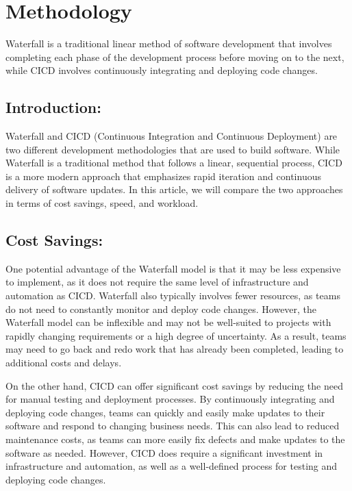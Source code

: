 \documentclass[
  10pt,
  paper=a4,
  ,captions=tableheading
]{scrartcl}
\begin{document}
\hypertarget{methodology}{%
\section{Methodology}\label{methodology}}

Waterfall is a traditional linear method of software development that
involves completing each phase of the development process before moving
on to the next, while CICD involves continuously integrating and
deploying code changes.

\hypertarget{introduction-1}{%
\subsection{Introduction:}\label{introduction-1}}

Waterfall and CICD (Continuous Integration and Continuous Deployment)
are two different development methodologies that are used to build
software. While Waterfall is a traditional method that follows a linear,
sequential process, CICD is a more modern approach that emphasizes rapid
iteration and continuous delivery of software updates. In this article,
we will compare the two approaches in terms of cost savings, speed, and
workload.

\hypertarget{cost-savings}{%
\subsection{Cost Savings:}\label{cost-savings}}

One potential advantage of the Waterfall model is that it may be less
expensive to implement, as it does not require the same level of
infrastructure and automation as CICD. Waterfall also typically involves
fewer resources, as teams do not need to constantly monitor and deploy
code changes. However, the Waterfall model can be inflexible and may not
be well-suited to projects with rapidly changing requirements or a high
degree of uncertainty. As a result, teams may need to go back and redo
work that has already been completed, leading to additional costs and
delays.

On the other hand, CICD can offer significant cost savings by reducing
the need for manual testing and deployment processes. By continuously
integrating and deploying code changes, teams can quickly and easily
make updates to their software and respond to changing business needs.
This can also lead to reduced maintenance costs, as teams can more
easily fix defects and make updates to the software as needed. However,
CICD does require a significant investment in infrastructure and
automation, as well as a well-defined process for testing and deploying
code changes.
\end{document}
